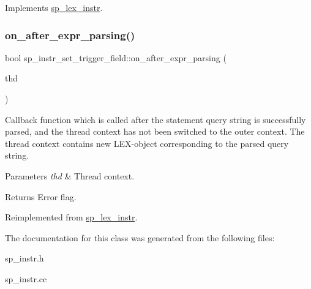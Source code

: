 Implements \mbox{\hyperlink{classsp__lex__instr_a56788cb475ccf94f224816006d9c90e9}{sp\+\_\+lex\+\_\+instr}}.

\mbox{\label{classsp__instr__set__trigger__field_ac578c371c355a3fa089ecec4872e2a59}} 
\subsubsection{\texorpdfstring{on\+\_\+after\+\_\+expr\+\_\+parsing()}{on\_after\_expr\_parsing()}}
{\footnotesize\ttfamily bool sp\+\_\+instr\+\_\+set\+\_\+trigger\+\_\+field\+::on\+\_\+after\+\_\+expr\+\_\+parsing (\begin{DoxyParamCaption}\item[{T\+HD $\ast$}]{thd }\end{DoxyParamCaption})\hspace{0.3cm}{\ttfamily [virtual]}}

Callback function which is called after the statement query string is successfully parsed, and the thread context has not been switched to the outer context. The thread context contains new L\+EX-\/object corresponding to the parsed query string.


\begin{DoxyParams}{Parameters}
{\em thd} & Thread context.\\
\hline
\end{DoxyParams}
\begin{DoxyReturn}{Returns}
Error flag. 
\end{DoxyReturn}


Reimplemented from \mbox{\hyperlink{classsp__lex__instr_adcace7d5b7daeb393d0592592a2d9d6c}{sp\+\_\+lex\+\_\+instr}}.



The documentation for this class was generated from the following files\+:\begin{DoxyCompactItemize}
\item 
sp\+\_\+instr.\+h\item 
sp\+\_\+instr.\+cc\end{DoxyCompactItemize}
